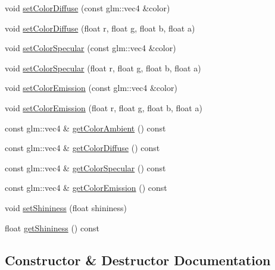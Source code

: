 \begin{DoxyCompactItemize}
\item 
void \mbox{\hyperlink{classec_1_1_material_a22b711323a849e2ff6f9ffb871402a3e}{set\+Color\+Diffuse}} (const glm\+::vec4 \&color)
\item 
void \mbox{\hyperlink{classec_1_1_material_aa86e76b930ffffd45076465eff08bf27}{set\+Color\+Diffuse}} (float r, float g, float b, float a)
\item 
void \mbox{\hyperlink{classec_1_1_material_a947f0946ff806852e1733b1e95a03489}{set\+Color\+Specular}} (const glm\+::vec4 \&color)
\item 
void \mbox{\hyperlink{classec_1_1_material_aa62e40f0571c25eb097f03c74849f918}{set\+Color\+Specular}} (float r, float g, float b, float a)
\item 
void \mbox{\hyperlink{classec_1_1_material_a77ac7702af54e4c8a7301387bea159dd}{set\+Color\+Emission}} (const glm\+::vec4 \&color)
\item 
void \mbox{\hyperlink{classec_1_1_material_a6fa0dfb1c76b2c9b07fbd2b28021010c}{set\+Color\+Emission}} (float r, float g, float b, float a)
\item 
const glm\+::vec4 \& \mbox{\hyperlink{classec_1_1_material_a68e143f6390ae7e9bc6c080853191f94}{get\+Color\+Ambient}} () const
\item 
const glm\+::vec4 \& \mbox{\hyperlink{classec_1_1_material_a6156c82b63756da91d013b5eb39fccf5}{get\+Color\+Diffuse}} () const
\item 
const glm\+::vec4 \& \mbox{\hyperlink{classec_1_1_material_a0a4a766b22c9adeffdff5c0d5140167e}{get\+Color\+Specular}} () const
\item 
const glm\+::vec4 \& \mbox{\hyperlink{classec_1_1_material_af6a4a55683956cd0b06d0a8de1dc4b9f}{get\+Color\+Emission}} () const
\item 
void \mbox{\hyperlink{classec_1_1_material_a4b9efb15466a547d4579566dfb1e558f}{set\+Shininess}} (float shininess)
\item 
float \mbox{\hyperlink{classec_1_1_material_a125ba490c4191f8f6fe77e76934ed33a}{get\+Shininess}} () const
\end{DoxyCompactItemize}


\subsection{Constructor \& Destructor Documentation}
\mbox{\label{classec_1_1_material_a259d88ca352df2d284380f0b37052652}} 
